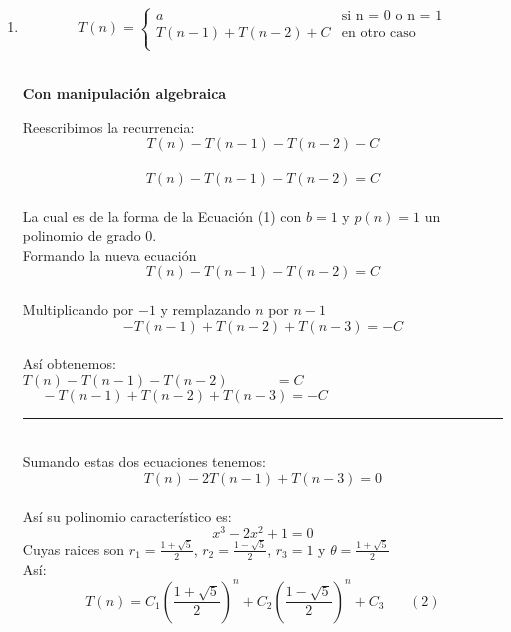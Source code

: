 \documentclass{article}
\theoremstyle{definition}
\theoremstyle{remark}
\begin{document}
\begin{enumerate}[1.]
Reescribimos la recurrencia: \\
$$ t_{n}-3t_{n-1}-2t_{n-2} = 3 \cdot 2^{n-2} $$\\
La cual es de la forma de la Ecuaci\'on (1) con $b=2$, $p(n)=3$ y $d=0$ un polinomio de grado 0.\\
As\'i su polinomio caracter\'istico es:\\
$$ (x-2)^{2}(x-1) $$
Cuyas raices son $ r_{2} = 2 $ y $r_{1} = 2$ (ra\'ices m\'ultiples) y $r_{1}=1$\\
$$t_n= C_{1} + C_{2}^{n} + C_{3}n2^{n}$$
Si $C_{3}>0$ entonces $t_{n}$ $\epsilon$ $O(n2^{n})$\\
Si sustituimos la Ecuaci\'on en la recurrencia original, obtenemos:\\
$$3 \cdot 2^{n-2} = (C_{1}+C_{2}^{n}+C_{3}n2^{n}) - 3(C_{1}+C_{2}^{n-1}+C_{3}(n-1)2^{n-1})$$
$$3 \cdot 2^{n-2} = \frac{C_{3}2^{n}}{2}$$
$$3 = \frac{C_{3}2^{n}}{2} \cdot \frac{1}{2^{n-2}}$$
$$3 = 2C_{3}$$ 
Por lo tanto\\
$$C_{3}=\frac{3}{2}$$
\clearpage



\item  $$T(n)= \left \{ 
\begin{matrix} 
a & \mbox{si n = }0\mbox{ o n = 1}\\ 
T(n-1)+T(n-2)+C & \mbox{en}\mbox{ otro caso}\\
\end{matrix}
\right. $$\\

\begin{center}
\textbf{Con manipulaci\'on algebraica}\\
\end{center}

Reescribimos la recurrencia: \\
$$ T(n)-T(n-1)-T(n-2)-C $$\\
$$ T(n)-T(n-1)-T(n-2)=C $$\\
La cual es de la forma de la Ecuaci\'on (1) con $b=1$ y $p(n)=1$ un polinomio de grado 0.\\
Formando la nueva ecuaci\'on
$$ T(n)-T(n-1)-T(n-2)=C $$\\
Multiplicando por $-1$ y remplazando $n$ por $n-1$\\
$$ -T(n-1)+T(n-2)+T(n-3)=-C $$\\
As\'i obtenemos:\\
$ T(n)-T(n-1)-T(n-2)~~~~~~~~~~~~~~~=C $\\
$ ~~~~~~-T(n-1)+T(n-2)+T(n-3)=-C$\\
\rule{80mm}{0.1mm}\\
Sumando estas dos ecuaciones tenemos: \\
$$ T(n)-2T(n-1)+T(n-3)=0 $$\\
As\'i su polinomio caracter\'istico es:\\
$$ x^{3}-2x^{2}+1=0 $$
Cuyas raices son $ r_{1} = \frac{1+\sqrt{5}}{2} $, $ r_{2} = \frac{1-\sqrt{5}}{2}$, $r_{3}=1$ y $\theta=\frac{1+\sqrt{5}}{2}$\\
As\'i: \\
$$T(n) = C_{1}(\frac{1+\sqrt{5}}{2})^{n} + C_{2}(\frac{1-\sqrt{5}}{2})^{n} + C_{3} ~~~~~~~~(2)$$
\clearpage


\end{enumerate}
\end{document}
